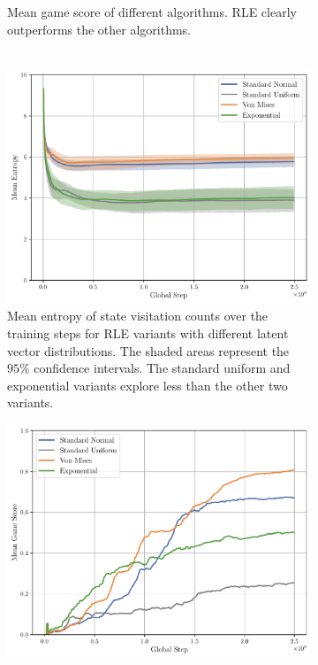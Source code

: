 \begin{figure}[h!]
\begin{subfigure}[b]{0.45\textwidth}
    \caption{Mean game score of different algorithms. \textsc{RLE} clearly outperforms the other algorithms.\\\\}
    \label{fig:gridworld-score-algorithms}
  \end{subfigure}
  \begin{subfigure}[b]{0.45\textwidth}
    \centering
    \includegraphics[width=\textwidth]{figures/gridworld_mean_entropy_state_visitation_distributions.pdf}
    \caption{Mean entropy of state visitation counts over the training steps for \textsc{RLE} variants with different latent vector distributions. The shaded areas represent the $95\%$ confidence intervals. The standard uniform and exponential variants explore less than the other two variants.}
    \label{fig:gridworld-entropy-distributions}
  \end{subfigure}
  \hfill
  \begin{subfigure}[b]{0.45\textwidth}
    \centering
    \includegraphics[width=\textwidth]{figures/gridworld_mean_game_score_distributions.pdf}

\end{subfigure}
\end{figure}
